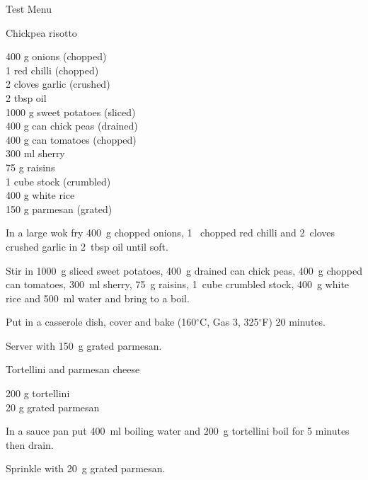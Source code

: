 \begin{menu}{Test Menu}
\begin{recipe}{2}{Chickpea risotto}
		\begin{ingredients}
		400 g onions (chopped) \\
	1  red chilli (chopped) \\
	2 cloves garlic (crushed) \\
	2 tbsp oil  \\
	1000 g sweet potatoes (sliced) \\
	400 g can chick peas (drained) \\
	400 g can tomatoes (chopped) \\
	300 ml sherry  \\
	75 g raisins  \\
	1 cube stock (crumbled) \\
	400 g white rice  \\
	150 g parmesan (grated) \\
	
		\end{ingredients}
	
    \begin{instructions}
    \item 
        In a large wok fry
        400~g chopped onions,
        1~ chopped red chilli
        and
        2~cloves crushed garlic
        in
        2~tbsp  oil
        until soft.
      \item 
        Stir in
        1000~g sliced sweet potatoes,
        400~g drained can chick peas,
        400~g chopped can tomatoes,
        300~ml  sherry,
        75~g  raisins,
        1~cube crumbled stock,
        400~g  white rice
        and
        500~ml  water
        and bring to a boil.
      \item 
        Put in a
        casserole dish,
        cover and bake 
      (160$^{\circ}$C, Gas 3, 325$^{\circ}$F)
     20 minutes.
      \item 
        Server with
        150~g grated parmesan.
      
    \end{instructions}
    \end{recipe}%
  
    \begin{recipe}{1}{Tortellini and parmesan cheese}%
    
		\begin{ingredients}
		200 g tortellini  \\
	20 g grated parmesan  \\
	
		\end{ingredients}
	
    \begin{instructions}
    \item 
      In a
      sauce pan
      put
      400~ml  boiling water
      and
      200~g  tortellini
      boil for 5 minutes then drain.
    \item 
        Sprinkle with
        20~g  grated parmesan.
      
    \end{instructions}
    \end{recipe}%
  
    \clearpage
    \end{menu}
	
